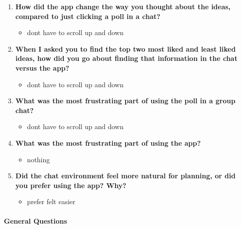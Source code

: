 \documentclass[12pt,a4paper]{article}
\begin{document}
\begin{enumerate}
    \item \textbf{How did the app change the way you thought about the ideas, compared to just clicking a poll in a chat?}
    
    \begin{itemize}
        \item dont have to scroll up and down
    \end{itemize}
    
    \item \textbf{When I asked you to find the top two most liked and least liked ideas, how did you go about finding that information in the chat versus the app?}
    
    \begin{itemize}
        \item dont have to scroll up and down
    \end{itemize}
    
    \item \textbf{What was the most frustrating part of using the poll in a group chat?}
    
    \begin{itemize}
        \item dont have to scroll up and down
    \end{itemize}
    
    \item \textbf{What was the most frustrating part of using the app?}
    
    \begin{itemize}
        \item nothing
    \end{itemize}
    
    \item \textbf{Did the chat environment feel more natural for planning, or did you prefer using the app? Why?}
    
    \begin{itemize}
        \item prefer felt easier
    \end{itemize}
\end{enumerate}

\paragraph{General Questions}
\end{document}
